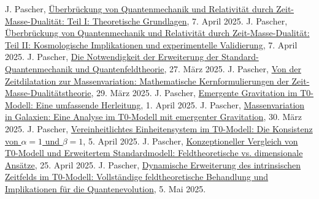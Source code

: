 \documentclass[12pt,a4paper]{article}
\begin{document}
	
	\begin{thebibliography}{99}
		 J. Pascher, \href{https://github.com/jpascher/T0-Time-Mass-Duality/tree/main/2/pdf/English/QMRelTimeMassPart1En.pdf}{Überbrückung von Quantenmechanik und Relativität durch Zeit-Masse-Dualität: Teil I: Theoretische Grundlagen}, 7. April 2025.
		 J. Pascher, \href{https://github.com/jpascher/T0-Time-Mass-Duality/tree/main/2/pdf/English/QMRelTimeMassPart2En.pdf}{Überbrückung von Quantenmechanik und Relativität durch Zeit-Masse-Dualität: Teil II: Kosmologische Implikationen und experimentelle Validierung}, 7. April 2025.
		 J. Pascher, \href{https://github.com/jpascher/T0-Time-Mass-Duality/tree/main/2/pdf/English/NotwendigkeitQMErweiterungEn.pdf}{Die Notwendigkeit der Erweiterung der Standard-Quantenmechanik und Quantenfeldtheorie}, 27. März 2025.
		 J. Pascher, \href{https://github.com/jpascher/T0-Time-Mass-Duality/tree/main/2/pdf/English/MathZeitMasseLagrangeEn.pdf}{Von der Zeitdilatation zur Massenvariation: Mathematische Kernformulierungen der Zeit-Masse-Dualitätstheorie}, 29. März 2025.
		 J. Pascher, \href{https://github.com/jpascher/T0-Time-Mass-Duality/tree/main/2/pdf/English/EmergentGravT0En.pdf}{Emergente Gravitation im T0-Modell: Eine umfassende Herleitung}, 1. April 2025.
		 J. Pascher, \href{https://github.com/jpascher/T0-Time-Mass-Duality/tree/main/2/pdf/English/MassVarGalaxienEn.pdf}{Massenvariation in Galaxien: Eine Analyse im T0-Modell mit emergenter Gravitation}, 30. März 2025.
		 J. Pascher, \href{https://github.com/jpascher/T0-Time-Mass-Duality/tree/main/2/pdf/English/Alpha1Beta1KonsistenzEn.pdf}{Vereinheitlichtes Einheitensystem im T0-Modell: Die Konsistenz von $\alpha = 1$ und $\beta = 1$}, 5. April 2025.
		 J. Pascher, \href{https://github.com/jpascher/T0-Time-Mass-Duality/tree/main/2/pdf/English/T0vsESM_ConceptualAnalysisEn.pdf}{Konzeptioneller Vergleich von T0-Modell und Erweitertem Standardmodell: Feldtheoretische vs. dimensionale Ansätze}, 25. April 2025.
		 J. Pascher, \href{https://github.com/jpascher/T0-Time-Mass-Duality/tree/main/2/pdf/English/DynamicTF-SchrodingerExtensions_En.pdf}{Dynamische Erweiterung des intrinsischen Zeitfelds im T0-Modell: Vollständige feldtheoretische Behandlung und Implikationen für die Quantenevolution}, 5. Mai 2025.

\end{thebibliography}
\end{document}

